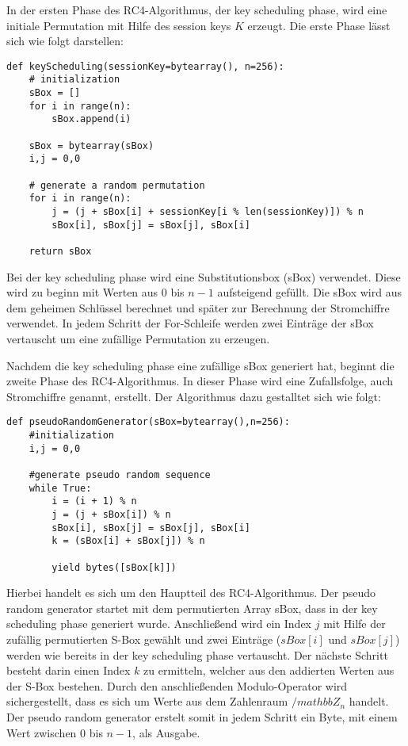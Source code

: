 \documentclass[10pt,a4paper]{article}
\begin{document}
In der ersten Phase des RC4-Algorithmus, der key scheduling phase, wird eine initiale Permutation mit Hilfe des session keys $K$ erzeugt. Die erste Phase lässt sich wie folgt darstellen:
\begin{lstlisting}
def keyScheduling(sessionKey=bytearray(), n=256):
    # initialization
    sBox = []
    for i in range(n):
        sBox.append(i)

    sBox = bytearray(sBox)
    i,j = 0,0

    # generate a random permutation
    for i in range(n):
        j = (j + sBox[i] + sessionKey[i % len(sessionKey)]) % n
        sBox[i], sBox[j] = sBox[j], sBox[i]

    return sBox
\end{lstlisting}
Bei der key scheduling phase wird eine Substitutionsbox (sBox) verwendet. Diese wird zu beginn mit Werten aus 0 bis $n-1$ aufsteigend gefüllt. Die sBox wird aus dem geheimen Schlüssel berechnet und später zur Berechnung der Stromchiffre verwendet. In jedem Schritt der For-Schleife werden zwei Einträge der sBox vertauscht um eine zufällige Permutation zu erzeugen. 

Nachdem die key scheduling phase eine zufällige sBox generiert hat, beginnt die zweite Phase des RC4-Algorithmus. In dieser Phase wird eine Zufallsfolge, auch Stromchiffre genannt, erstellt. Der Algorithmus dazu gestalltet sich wie folgt:
\begin{lstlisting}
def pseudoRandomGenerator(sBox=bytearray(),n=256):
    #initialization
    i,j = 0,0

    #generate pseudo random sequence
    while True:
        i = (i + 1) % n
        j = (j + sBox[i]) % n
        sBox[i], sBox[j] = sBox[j], sBox[i]
        k = (sBox[i] + sBox[j]) % n

        yield bytes([sBox[k]])
\end{lstlisting}
Hierbei handelt es sich um den Hauptteil des RC4-Algorithmus.  Der pseudo random generator startet mit dem permutierten Array sBox, dass in der key scheduling phase generiert wurde. Anschließend wird ein Index $j$ mit Hilfe der zufällig permutierten S-Box gewählt und zwei Einträge ($sBox[i]$ und $sBox[j]$) werden wie bereits in der key scheduling phase vertauscht. Der nächste Schritt besteht darin einen Index $k$ zu ermitteln, welcher aus den addierten Werten aus der S-Box bestehen. Durch den anschließenden Modulo-Operator wird sichergestellt, dass es sich um Werte aus dem Zahlenraum $/mathbb{Z}_n$ handelt. Der pseudo random generator erstelt somit in jedem Schritt ein Byte, mit einem Wert zwischen $0$ bis $n-1$, als Ausgabe.
\end{document}
